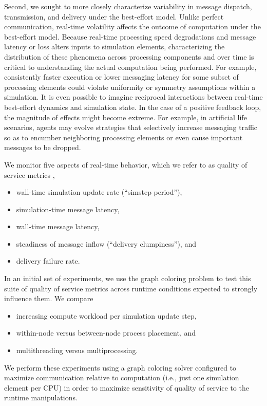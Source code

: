 Second, we sought to more closely characterize variability in message dispatch, transmission, and delivery under the best-effort model.
Unlike perfect communication, real-time volatility affects the outcome of computation under the best-effort model.
Because real-time processing speed degradations and message latency or loss alters inputs to simulation elements, characterizing the distribution of these phenomena across processing components and over time is critical to understanding the actual computation being performed.
For example, consistently faster execution or lower messaging latency for some subset of processing elements could violate uniformity or symmetry assumptions within a simulation.
It is even possible to imagine reciprocal interactions between real-time best-effort dynamics and simulation state.
In the case of a positive feedback loop, the magnitude of effects might become extreme.
For example, in artificial life scenarios, agents may evolve strategies that selectively increase messaging traffic so as to encumber neighboring processing elements or even cause important messages to be dropped.

We monitor five aspects of real-time behavior, which we refer to as quality of service metrics \citep{karakus2017quality},
\begin{itemize}
  \item wall-time simulation update rate (``simstep period''),
  \item simulation-time message latency,
  \item wall-time message latency,
  \item steadiness of message inflow (``delivery clumpiness''), and
  \item delivery failure rate.
\end{itemize}

In an initial set of experiments, we use the graph coloring problem to test this suite of quality of service metrics across runtime conditions expected to strongly influence them.
We compare
\begin{itemize}
  \item increasing compute workload per simulation update step,
  \item within-node versus between-node process placement, and
  \item multithreading versus multiprocessing.
\end{itemize}
We perform these experiments using a graph coloring solver configured to maximize communication relative to computation (i.e., just one simulation element per CPU) in order to maximize sensitivity of quality of service to the runtime manipulations.

